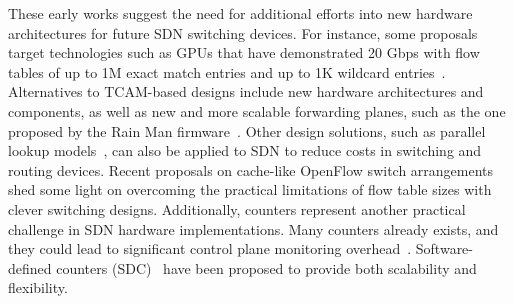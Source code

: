  These early works suggest the need for additional efforts into new hardware architectures for future 
SDN switching devices. For instance, some proposals target technologies such as GPUs that have demonstrated 
20 Gbps with flow tables of up to 1M exact match entries and up to 1K wildcard entries~\cite{memon2013}. 
Alternatives to TCAM-based designs include new hardware architectures and components, as well as new and more 
scalable forwarding planes, such as the one proposed by the Rain Man firmware~\cite{stephens2012}.
Other design solutions, such as parallel lookup models~\cite{li2013}, can also be applied to SDN to reduce 
costs in switching and routing devices. Recent proposals on cache-like OpenFlow switch arrangements~\cite{katta2013} shed some light on overcoming the practical limitations of 
flow table sizes with clever switching designs. Additionally, counters represent another practical challenge 
in SDN hardware implementations. Many counters already exists, and they could lead to significant control 
plane monitoring overhead~\cite{curtis2011}. Software-defined counters 
(SDC)~\cite{mogul2012} have been proposed to provide both scalability and flexibility.

